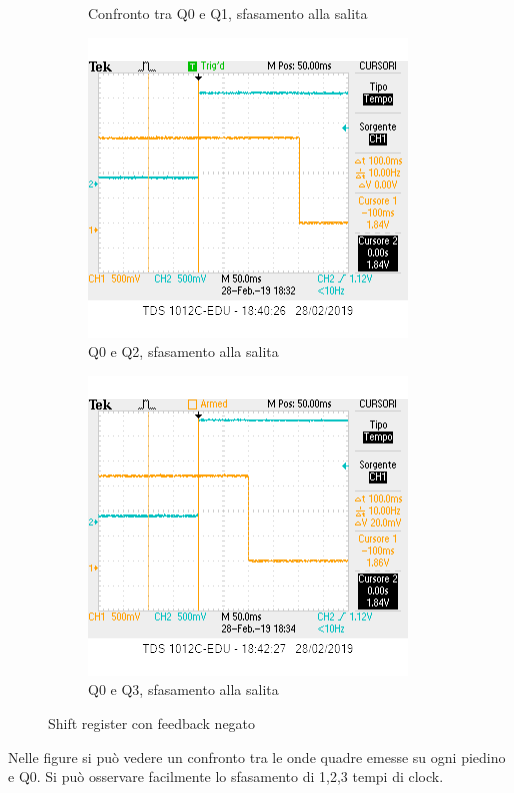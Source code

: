 \documentclass[10pt,a4paper]{article}
\begin{document}
\begin{figure}[h]
\begin{subfigure}[b]{0.4\linewidth}
		\caption{Confronto tra Q0 e Q1, sfasamento alla salita}
	\end{subfigure}
	\newline
	\begin{subfigure}[b]{0.4\linewidth}
		\includegraphics[width=\linewidth]{q0q2sr.png}
		\caption{Q0 e Q2, sfasamento alla salita}
	\end{subfigure}
	\begin{subfigure}[b]{0.4\linewidth}
		\includegraphics[width=\linewidth]{q0q3sr.png}
		\caption{Q0 e Q3, sfasamento alla salita}
	\end{subfigure}
	\caption{Shift register con feedback negato}
\end{figure}

Nelle figure si può  vedere un confronto tra le onde quadre emesse su ogni piedino e Q0. Si può osservare facilmente lo sfasamento di 1,2,3 tempi di clock.
\end{document}
